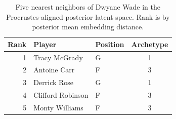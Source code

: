 \begin{table}[htbp]
  \centering\small
  \begin{tabular}{rllc}
    \toprule
    Rank & Player & Position & Archetype \\
    \midrule
    1 & Tracy McGrady & G & 1 \\
    2 & Antoine Carr & F & 3 \\
    3 & Derrick Rose & G & 1 \\
    4 & Clifford Robinson & F & 3 \\
    5 & Monty Williams & F & 3 \\
    \bottomrule
  \end{tabular}
  \caption{Five nearest neighbors of Dwyane Wade in the Procrustes-aligned posterior latent space. Rank is by posterior mean embedding distance.}
  \label{tab:Dwyane_Wade_neighbors}
\end{table}

